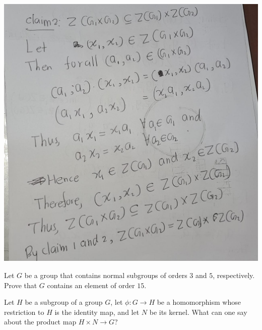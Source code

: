\documentclass[
]{book}
\begin{document}
\includegraphics{figures/ch_2/fig05.jpg}

\leavevmode{}%
Let \(G\) be a group that contains normal subgroups of orders \(3\) and
\(5\), respectively. Prove that \(G\) contains an element of order
\(15\).

\leavevmode{}%
Let \(H\) be a subgroup of a group \(G\), let \(\phi:G \to H\) be a
homomorphism whose restriction to \(H\) is the identity map, and let
\(N\) be its kernel. What can one say about the product map
\(H \times N \to G\)?
\end{document}
